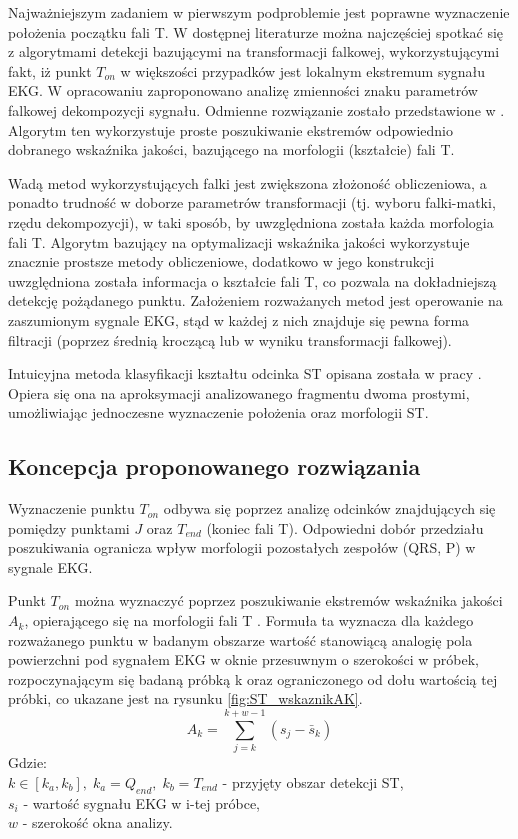 Najważniejszym zadaniem w pierwszym podproblemie jest poprawne wyznaczenie położenia początku fali T. W dostępnej literaturze można najczęściej spotkać się z algorytmami detekcji bazującymi na transformacji falkowej, wykorzystującymi fakt, iż punkt $ T_{on} $ w większości przypadków jest lokalnym ekstremum sygnału EKG. W opracowaniu \cite{STInt3} zaproponowano analizę zmienności znaku parametrów falkowej dekompozycji sygnału. Odmienne rozwiązanie zostało przedstawione w \cite{STInt1}. Algorytm ten wykorzystuje proste poszukiwanie ekstremów odpowiednio dobranego wskaźnika jakości, bazującego na morfologii (kształcie) fali T.

Wadą metod wykorzystujących falki jest zwiększona złożoność obliczeniowa, a ponadto trudność w doborze parametrów transformacji (tj. wyboru falki-matki, rzędu dekompozycji), w taki sposób, by uwzględniona została każda morfologia fali T. Algorytm bazujący na optymalizacji wskaźnika jakości wykorzystuje znacznie prostsze metody obliczeniowe, dodatkowo w jego konstrukcji uwzględniona została informacja o kształcie fali T, co pozwala na dokładniejszą detekcję pożądanego punktu. Założeniem rozważanych metod jest operowanie na zaszumionym sygnale EKG, stąd w każdej z nich znajduje się pewna forma filtracji (poprzez średnią kroczącą lub w wyniku transformacji falkowej).

Intuicyjna metoda klasyfikacji kształtu odcinka ST opisana została w pracy \cite{STInt2}. Opiera się ona na aproksymacji analizowanego fragmentu dwoma prostymi, umożliwiając jednoczesne wyznaczenie położenia oraz morfologii ST.

\subsection{Koncepcja proponowanego rozwiązania}
Wyznaczenie punktu $ T_{on} $ odbywa się poprzez analizę odcinków znajdujących się pomiędzy punktami $ J $ oraz $ T_{end} $ (koniec fali T). Odpowiedni dobór przedziału poszukiwania ogranicza wpływ morfologii pozostałych zespołów (QRS, P) w sygnale EKG.

Punkt $ T_{on} $ można wyznaczyć poprzez poszukiwanie ekstremów wskaźnika jakości $ A_k $, opierającego się na morfologii fali T \cite{STInt1}. Formuła ta wyznacza dla każdego rozważanego punktu w badanym obszarze wartość stanowiącą analogię pola powierzchni pod sygnałem EKG w oknie przesuwnym o szerokości w próbek, rozpoczynającym się badaną próbką k oraz ograniczonego od dołu wartością tej próbki, co ukazane jest na rysunku \ref{fig:ST_wskaznikAK}.
\begin{equation}
	A_k = \sum_{j=k}^{k+w-1} \left( s_j-\bar{s}_k \right)
\end{equation}
Gdzie:\\
$ k \in \left[ k_a, k_b \right], \; k_a=Q_{end}, \; k_b=T_{end} $ - przyjęty obszar detekcji ST,\\
$ s_i $ - wartość sygnału EKG w i-tej próbce,\\
$ w $ - szerokość okna analizy.\\

